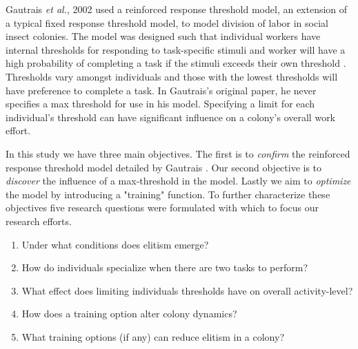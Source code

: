 \documentclass[a4paper]{article}
\begin{document}

Gautrais \textit{et al.}, 2002 used a reinforced response threshold model, an extension of a typical fixed response threshold model, to model division of labor in social insect colonies. The model was designed such that individual workers have internal thresholds for responding to task-specific stimuli and worker will have a high probability of completing a task if the stimuli exceeds their own threshold \cite{bonabeau}.  Thresholds vary amongst individuals and those with the lowest thresholds will have preference to complete a task. In Gautrais's original paper, he never specifies a max threshold for use in his model. Specifying a limit for each individual's threshold can have significant influence on a colony's overall work effort.





In this study we have three main objectives. The first is to \textit{confirm}  the reinforced response threshold model detailed by Gautrais \cite{Gautrais}. Our second objective is to \textit{discover}  the influence of a max-threshold in the model. Lastly we aim to \textit{optimize} the model by introducing a "training" function. To further characterize these objectives five research questions were formulated with which to focus our research efforts.
\begin{enumerate}
  \item Under what conditions does elitism emerge?
  \item How do individuals specialize when there are two tasks to perform?
  \item What effect does limiting  individuals thresholds have on overall activity-level?
  \item How does a training option alter colony dynamics?
  \item What training options (if any) can reduce elitism in a colony?
\end{enumerate}
\end{document}
